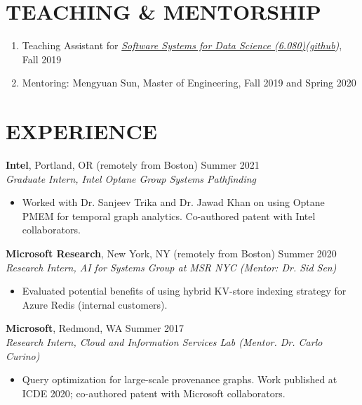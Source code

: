 \documentclass[centered,overlapped]{res}
\begin{document}
\begin{resume}
\section{TEACHING \& MENTORSHIP}
\begin{enumerate}
  \item Teaching Assistant for {\sl \href{http://dsg.csail.mit.edu/6.S080/}{Software Systems for Data Science (6.080)}(\href{https://github.com/mitdbg/datascienceclass}{github})}, Fall 2019
  \item Mentoring: Mengyuan Sun, Master of Engineering, Fall 2019 and Spring 2020
\end{enumerate}

\section{EXPERIENCE}

  \textbf{Intel}, Portland, OR (remotely from Boston) \hfill Summer 2021 \\
  {\sl Graduate Intern, Intel Optane Group Systems Pathfinding}
  \begin{itemize}
  \item Worked with Dr. Sanjeev Trika and Dr. Jawad Khan on using Optane PMEM for temporal graph analytics. Co-authored patent with Intel collaborators.
  \end{itemize}

  \textbf{Microsoft Research}, New York, NY (remotely from Boston) \hfill Summer 2020 \\
  {\sl Research Intern, AI for Systems Group at MSR NYC (Mentor: Dr. Sid Sen)}
  \begin{itemize}
  \item Evaluated potential benefits of using hybrid KV-store indexing strategy for Azure Redis (internal customers).
  \end{itemize}

  \textbf{Microsoft}, Redmond, WA \hfill Summer 2017 \\
  {\sl Research Intern, Cloud and Information Services Lab (Mentor. Dr. Carlo Curino)}
  \begin{itemize}
  \item Query optimization for large-scale provenance graphs. Work published at ICDE 2020; co-authored patent with Microsoft collaborators.
  \end{itemize}


\end{resume}
\end{document}
